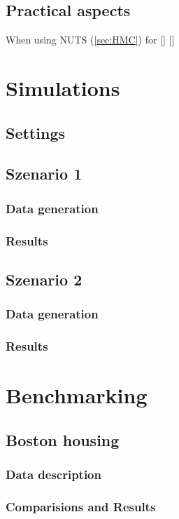 \documentclass[12pt,letterpaper]{article}
\numberwithin{equation}{subsection}
\begin{document}
\subsection{Practical aspects}
\label{sec:pract}
When using NUTS (\ref{sec:HMC}) for 
[\cite{reparam}]
[\cite{paramprob}]
\pagebreak

\section{Simulations}
\label{sec:sim}
\subsection{Settings}

\subsection{Szenario 1}
\subsubsection{Data generation}
\subsubsection{Results}
\subsection{Szenario 2}
\subsubsection{Data generation}
\subsubsection{Results}
\pagebreak

\section{Benchmarking}

\subsection{Boston housing}
\subsubsection{Data description}
\subsubsection{Comparisions and Results}
\end{document}
